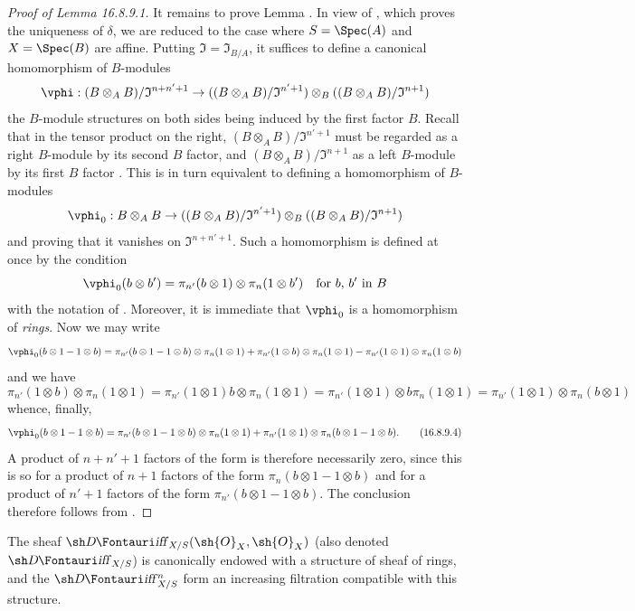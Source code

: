 \begin{proof}[Proof of Lemma 16.8.9.1]
It remains to prove Lemma .
In view of , which proves the uniqueness of $\delta$, we are reduced to the case where $S = \Spec(A)$ and $X = \Spec(B)$ are affine.
Putting $\mathfrak{I} = \mathfrak{I}_{B/A}$, it suffices to define a canonical homomorphism of $B$-modules
\[
  \vphi: (B \otimes_A B)/\mathfrak{I}^{n+n'+1} \to ((B \otimes_A B)/\mathfrak{I}^{n' + 1}) \otimes_B ((B \otimes_A B)/\mathfrak{I}^{n + 1})
\]
the $B$-module structures on both sides being induced by the first factor $B$.
Recall that in the tensor product on the right, $(B \otimes_A B)/\mathfrak{I}^{n' + 1}$ must be regarded
as a right $B$-module by its second $B$ factor, and $(B \otimes_A B)/\mathfrak{I}^{n + 1}$ as a left $B$-module by its first $B$ factor .
This is in turn equivalent to defining a homomorphism of $B$-modules
\[
  \vphi_0: B \otimes_A B \to ((B \otimes_A B)/\mathfrak{I}^{n' + 1}) \otimes_B ((B \otimes_A B)/\mathfrak{I}^{n + 1})
\]
and proving that it vanishes on $\mathfrak{I}^{n+n'+1}$.
Such a homomorphism is defined at once by the condition
\[
  \vphi_0(b \otimes b') = \pi_{n'}(b \otimes 1) \otimes \pi_n(1 \otimes b') \quad \text{for $b$, $b'$ in $B$}
\]
with the notation of .
Moreover, it is immediate that $\vphi_0$ is a homomorphism of \emph{rings}.
Now we may write
\[
  \vphi_0(b \otimes 1 - 1 \otimes b) = \pi_{n'}(b \otimes 1 - 1 \otimes b) \otimes \pi_n(1 \otimes 1) + \pi_{n'}(1 \otimes b) \otimes \pi_n(1 \otimes 1) - \pi_{n'}(1 \otimes 1) \otimes \pi_n(1 \otimes b)
\]
and we have 
\[
  \pi_{n'}(1 \otimes b) \otimes \pi_n(1 \otimes 1) = \pi_{n'}(1 \otimes 1) b \otimes \pi_n(1 \otimes 1) = \pi_{n'}(1 \otimes 1) \otimes b \pi_n(1 \otimes 1) = \pi_{n'}(1 \otimes 1) \otimes \pi_n(b \otimes 1)
\]
whence, finally,
\[
  \label{IV.16.8.9.4}
  \vphi_0(b \otimes 1 - 1 \otimes b) = \pi_{n'}(b \otimes 1 - 1 \otimes b) \otimes \pi_n(1 \otimes 1) + \pi_{n'}(1 \otimes 1) \otimes \pi_n(b \otimes 1 - 1 \otimes b). 
  \tag{16.8.9.4}
\]
A product of $n + n' + 1$ factors of the form  is therefore necessarily zero, since this is so for a product of $n+1$ factors of the form $\pi_n(b \otimes 1 - 1 \otimes b)$ and for a product of $n' + 1$ factors of the form $\pi_{n'}(b \otimes 1 - 1 \otimes b)$.
The conclusion therefore follows from .
\end{proof}

\begin{corollary}[16.8.10]
\label{IV.16.8.10}
The sheaf $\shDiff_{X/S}(\sh{O}_X, \sh{O}_X)$ (also denoted $\shDiff_{X/S}$) is canonically endowed with a structure of sheaf of rings, and the $\shDiff_{X/S}^n$ form an increasing filtration compatible with this structure.
\end{corollary}

